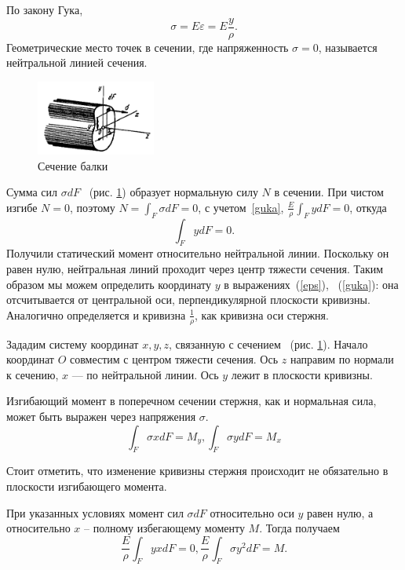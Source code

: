 \documentclass[12pt, a4paper]{article}
\begin{document}
По закону Гука, 
\begin{equation}
	\label{guka}
	\sigma = E \varepsilon = E \frac{y}{\rho}.
\end{equation}
Геометрические место точек в сечении, где напряженность $\sigma = 0$, называется нейтральной линией сечения.
\begin{figure}[!h]
	\centering
	\includegraphics[width=0.35\textwidth]{pic.5}%
	\caption{Сечение балки}
	\vspace*{-2mm}
	\label{pic5}
\end{figure}

Сумма сил $\sigma d F$ ~(рис. \ref{pic5}) образует нормальную силу $N$ в сечении. При чистом изгибе $N = 0$, поэтому $N = \int_{F} \sigma d F = 0$, с учетом~\ref{guka}, $\frac{E}{\rho} \int_{F} y d F = 0$, откуда 
\begin{equation}
	\label{ydF}
	\int_{F} y d F = 0.
\end{equation}
Получили статический момент относительно нейтральной линии. Поскольку он равен нулю, нейтральная линий проходит через центр тяжести сечения. Таким образом мы можем определить координату $y$ в выражениях~(\ref{eps}), ~(\ref{guka}): она отсчитывается от центральной оси, перпендикулярной плоскости кривизны. Аналогично определяется и кривизна $\frac{1}{\rho}$, как кривизна оси стержня. 

Зададим систему координат $x, y, z$, связанную с сечением ~(рис. \ref{pic5}). Начало координат $O$ совместим с центром тяжести сечения. Ось $z$ направим по нормали к сечению, $x$ --- по нейтральной линии. Ось $y$ лежит в плоскости кривизны.

Изгибающий момент в поперечном сечении стержня, как и нормальная сила, может быть выражен через напряжения $\sigma$. 
\begin{equation}
	\label{bendM}
	\int_{F} \sigma x d F = M_y, \int_{F} \sigma y d F = M_x
\end{equation}

Стоит отметить, что изменение кривизны стержня происходит не обязательно в плоскости изгибающего момента.

При указанных условиях момент сил $\sigma d F$ относительно оси $y$ равен нулю, а относительно $x$ -- полному избегающему моменту $M$. Тогда получаем
\begin{equation}
	\label{bendM2}
	\frac{E}{\rho} \int_{F} y x d F = 0, \frac{E}{\rho} \int_{F} \sigma y^2 d F = M.
\end{equation}
\end{document}
